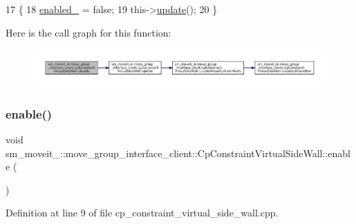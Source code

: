 \begin{DoxyCode}
17         \{
18             \hyperlink{classsm__moveit__4_1_1move__group__interface__client_1_1CpConstraintVirtualSideWall_a14d8cbbcc4b6f3fa158959b1eb1adc0f}{enabled\_} = \textcolor{keyword}{false};
19             this->\hyperlink{classsm__moveit__4_1_1move__group__interface__client_1_1CpConstraintVirtualSideWall_a3a2636a6652706bc81721c0ce2d90643}{update}();
20         \}
\end{DoxyCode}
Here is the call graph for this function\+:
\nopagebreak
\begin{figure}[H]
\begin{center}
\leavevmode
\includegraphics[width=350pt]{classsm__moveit__4_1_1move__group__interface__client_1_1CpConstraintVirtualSideWall_a5a138024982e4c1f5aaf62fd8e5be3fd_cgraph}
\end{center}
\end{figure}
\mbox{\label{classsm__moveit__4_1_1move__group__interface__client_1_1CpConstraintVirtualSideWall_a9a74d952f6ce519e327305cf06f69daa}} 
\subsubsection{\texorpdfstring{enable()}{enable()}}
{\footnotesize\ttfamily void sm\+\_\+moveit\+\_\+::move\+\_\+group\+\_\+interface\+\_\+client\+::\+Cp\+Constraint\+Virtual\+Side\+Wall\+::enable (\begin{DoxyParamCaption}{ }\end{DoxyParamCaption})}



Definition at line 9 of file cp\+\_\+constraint\+\_\+virtual\+\_\+side\+\_\+wall.\+cpp.



